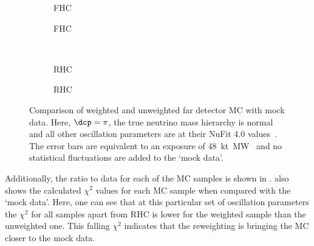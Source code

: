 \begin{figure}[h]
	\begin{subfigure}[t]{.5\linewidth}
		\begin{adjustbox}{max totalsize=\linewidth, center}
			
		\end{adjustbox}
		\caption{FHC \numu}
	\end{subfigure}
	\hfill
	\begin{subfigure}[t]{.5\linewidth}
		\begin{adjustbox}{max totalsize=\linewidth, center}
			
		\end{adjustbox}
		\caption{FHC \nue}
	\end{subfigure} \\
	\begin{subfigure}[t]{.5\linewidth}
		\begin{adjustbox}{max totalsize=\linewidth, center}
			
		\end{adjustbox}
		\caption{RHC \anumu}
	\end{subfigure}
	\hfill
	\begin{subfigure}[t]{.5\linewidth}
		\begin{adjustbox}{max totalsize=\linewidth, center}
			
		\end{adjustbox}
		\caption{RHC \anue}
	\end{subfigure}
	\caption[Comparison of weighted and unweighted far detector MC with mock data]{Comparison of weighted and unweighted far detector MC with mock data. Here, $\dcp=\pi$, the true neutrino mass hierarchy is normal and all other oscillation parameters are at their NuFit 4.0 values~\cite{nufit4}. The error bars are equivalent to an exposure of \SI{48}{\kilo\tonne\mega\watt\year} and no statistical fluctuations are added to the `mock data'.}
	\label{fig:reweightedSamples}
\end{figure}

Additionally, the ratio to data for each of the MC samples is shown in .
 also shows the calculated $\chi^{2}$ values for each MC sample when compared with the `mock data'.
Here, one can see that at this particular set of oscillation parameters the $\chi^{2}$ for all samples apart from \nue RHC is lower for the weighted sample than the unweighted one.
This falling $\chi^{2}$ indicates that the reweighting is bringing the MC closer to the mock data.

